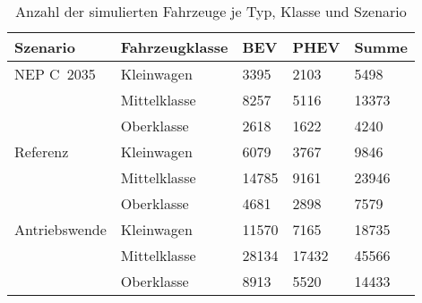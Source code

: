 {
\renewcommand{\arraystretch}{1.2}%
\begin{table}[H]
	\begin{center}
		\caption{Anzahl der simulierten Fahrzeuge je Typ, Klasse und Szenario}
		\begin{tabu} to 0.8\textwidth {X[1.5] X[1.5] X[1, r] X[1, r] X[1, r]}
			\toprule
			Szenario         & Fahrzeugklasse & BEV         & PHEV        & Summe       \\ \midrule
			NEP C~\num{2035} & Kleinwagen     & \num{3395}  & \num{2103}  & \num{5498}  \\
							 & Mittelklasse   & \num{8257}  & \num{5116}  & \num{13373} \\
							 & Oberklasse     & \num{2618}  & \num{1622}  & \num{4240}  \\ \midrule
			Referenz         & Kleinwagen     & \num{6079}  & \num{3767}  & \num{9846}  \\
							 & Mittelklasse   & \num{14785} & \num{9161}  & \num{23946} \\
							 & Oberklasse     & \num{4681}  & \num{2898}  & \num{7579}  \\ \midrule
			Antriebswende    & Kleinwagen     & \num{11570} & \num{7165}  & \num{18735} \\
							 & Mittelklasse   & \num{28134} & \num{17432} & \num{45566} \\
							 & Oberklasse     & \num{8913}  & \num{5520}  & \num{14433} \\ \bottomrule
		\end{tabu}
		\label{tab:car_count_long}
	\end{center}
	\vspace{-3mm}%
\end{table}
}